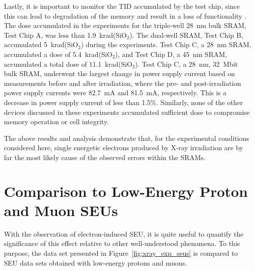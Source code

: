 Lastly, it is important to monitor the TID accumulated by the test chip, since this can lead to degradation of the memory and result in a loss of functionality \cite{Fleetwood:1987cf}. 
The dose accumulated in the experiments for the triple-well 28~nm bulk SRAM, Test Chip A, was less than 1.9~krad(SiO$_2$). 
The dual-well SRAM, Test Chip B, accumulated 5~krad(SiO$_2$) during the experiments. 
Test Chip C, a 28~nm SRAM, accumulated a dose of 5.4~krad(SiO$_2$), and Test Chip D, a 45~nm SRAM, accumulated a total dose of 11.1~krad(SiO$_2$). 
Test Chip C, a 28~nm, 32~Mbit bulk SRAM, underwent the largest change in power supply current based on measurements before and after irradiation, where the pre- and post-irradiation power supply currents were 82.7~mA and 81.5~mA, respectively.
This is a decrease in power supply current of less than 1.5\%.
Similarly, none of the other devices discussed in these experiments accumulated sufficient dose to compromise memory operation or cell integrity.

The above results and analysis demonstrate that, for the experimental conditions considered here, single energetic electrons produced by X-ray irradiation are by far the most likely cause of the observed errors within the SRAMs.

\section{Comparison to Low-Energy Proton and Muon SEUs} %
\label{sec:comparison_to_low_energy_proton_and_muon_seus}
With the observation of electron-induced SEU, it is quite useful to quantify the significance of this effect relative to other well-understood phenomena. 
To this purpose, the data set presented in Figure~\ref{fig:xray_exp_seus} is compared to SEU data sets obtained with low-energy protons and muons.

